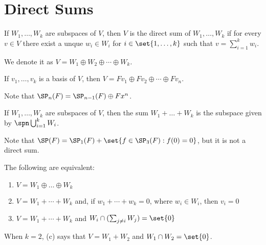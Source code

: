 \documentclass[11pt]{scrartcl}
\begin{document}
\section{Direct Sums}

\begin{definition}
  If $W_1, \dots, W_k$ are subspaces of $V$, then $V$ is the direct sum
  of $W_1, \dots, W_k$ if for every $v\in V$ there exist a unque
  $w_i\in W_i$ for $i\in\set{1, \dots, k}$ such that $v = \sum_{i=1}^k w_{i}$.

  We denote it as $V = W_1\oplus W_2 \oplus \cdots \oplus W_k$.
\end{definition}

\begin{example}

  If $v_1, \dots, v_{k}$ is a basis of $V$, then
  $V = Fv_1\oplus Fv_2 \oplus \cdots \oplus Fv_n$.
\end{example}

\begin{example}

Note that $\SP_n(F) = \SP_{n-1}(F)\oplus Fx^{n}$.

\end{example}

\begin{definition}
  If $W_1, \dots, W_k$ are subspaces of $V$, then the sum
  $W_1+\dots+W_k$ is the subspace given by $\spn \bigcup_{i=1}^kW_{i}$.
\end{definition}

\begin{example}

  Note that $\SP(F) = \SP_{1}(F) + \set{f\in \SP_3(F): f(0) = 0} $, but
  it is not a direct sum.

\end{example}

\begin{theorem}
\label{sec:direct-sums}
  The following are equivalent:
\begin{enumerate}[label=(\alph*)]
\item $V = W_1\oplus \dots \oplus W_{k}$
\item $V = W_{1} + \cdots + W_k $ and,  if $w_1+\cdots +w_k = 0$, where $w_i\in W_{i}$, then $v_i= 0$
\item $V = W_{1} + \cdots + W_k $ and $W_i\cap(\sum_{j\neq i}W_{j}) = \set{0}$
\end{enumerate}
\end{theorem}
\begin{remark}
  When $k=2$, (c) says that $V = W_1+W_2$ and $W_1\cap W_2 = \set{0}$.
\end{remark}
\end{document}
